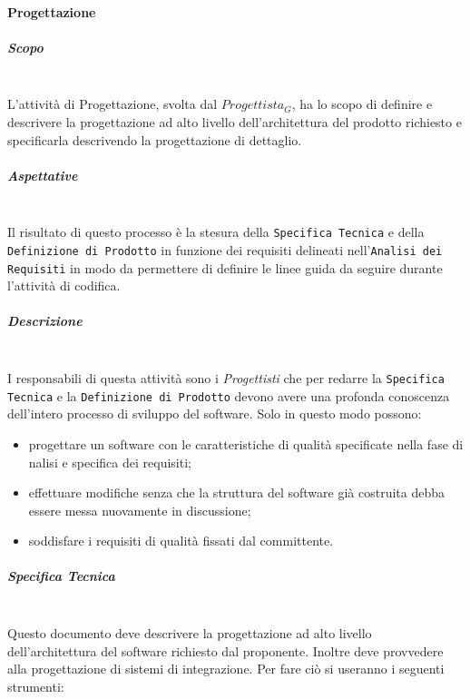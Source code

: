 		\paragraph{Progettazione}
			\subparagraph{Scopo}
			\mbox{}\\
			L'attività di Progettazione, svolta dal \emph{$Progettista_G$}, ha lo scopo di definire e descrivere la progettazione ad alto livello dell'architettura del prodotto richiesto e specificarla descrivendo la progettazione di dettaglio.
			\subparagraph{Aspettative}
			\mbox{}\\
			Il risultato di questo processo è la stesura della \texttt{Specifica Tecnica} e della \texttt{Definizione di Prodotto} in funzione dei requisiti delineati nell'\texttt{Analisi dei Requisiti} in modo da permettere di definire le linee guida da seguire durante l'attività di codifica.
			\subparagraph{Descrizione}
			\mbox{}\\
			I responsabili di questa attività sono i \emph{Progettisti} che per redarre la \texttt{Specifica Tecnica} e la \texttt{Definizione di Prodotto} devono avere una profonda conoscenza dell'intero processo di sviluppo del software.
			Solo in questo modo possono:
			\begin{itemize}
				\item progettare un software con le caratteristiche di qualità specificate nella fase di nalisi e specifica dei requisiti;
				\item effettuare modifiche senza che la struttura del software già costruita debba essere messa nuovamente in discussione;
				\item soddisfare i requisiti di qualità fissati dal committente.
			\end{itemize}
			\subparagraph{Specifica Tecnica}
			\mbox{}\\
			Questo documento deve descrivere la progettazione ad alto livello dell'architettura del software richiesto dal proponente. Inoltre deve provvedere alla progettazione di sistemi di integrazione. 
			Per fare ciò si useranno i seguenti strumenti:
